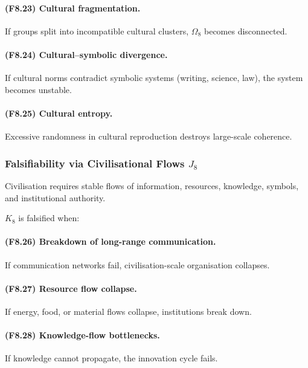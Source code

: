 \paragraph{(F8.23) Cultural fragmentation.}
If groups split into incompatible cultural clusters,
$\Omega_8$ becomes disconnected.

\paragraph{(F8.24) Cultural–symbolic divergence.}
If cultural norms contradict symbolic systems (writing, science, law),
the system becomes unstable.

\paragraph{(F8.25) Cultural entropy.}
Excessive randomness in cultural reproduction
destroys large-scale coherence.



\subsubsection{Falsifiability via Civilisational Flows \texorpdfstring{$J_8$}{J_8}}

Civilisation requires stable flows of information, resources,
knowledge, symbols, and institutional authority.

$K_8$ is falsified when:

\paragraph{(F8.26) Breakdown of long-range communication.}
If communication networks fail,
civilisation-scale organisation collapses.

\paragraph{(F8.27) Resource flow collapse.}
If energy, food, or material flows collapse,
institutions break down.

\paragraph{(F8.28) Knowledge-flow bottlenecks.}
If knowledge cannot propagate,
the innovation cycle fails.

